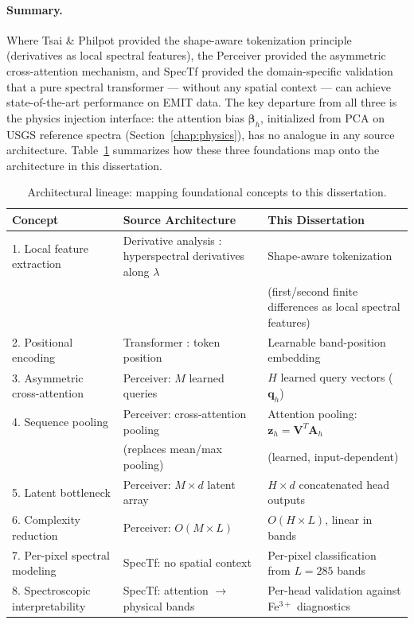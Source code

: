 \documentclass[11pt]{report}
\begin{document}
\paragraph{Summary.}
Where Tsai \& Philpot provided the shape-aware tokenization principle (derivatives as local spectral features), the Perceiver provided the asymmetric cross-attention mechanism, and SpecTf provided the domain-specific validation that a pure spectral transformer --- without any spatial context --- can achieve state-of-the-art performance on EMIT data. The key departure from all three is the physics injection interface: the attention bias $\bm{\beta}_h$, initialized from PCA on USGS reference spectra (Section~\ref{chap:physics}), has no analogue in any source architecture. Table~\ref{tab:arch_inspirations} summarizes how these three foundations map onto the architecture in this dissertation.

\begin{table}[htbp]
\centering
\caption{Architectural lineage: mapping foundational concepts to this dissertation.}
\label{tab:arch_inspirations}
\begin{tabular}{p{}p{}p{}}
\hline
\textbf{Concept} & \textbf{Source Architecture} & \textbf{This Dissertation} \\
\hline
1. Local feature extraction & Derivative analysis \cite{tsai1998derivative}: hyperspectral derivatives along $\lambda$ & Shape-aware tokenization \\
 & & (first/second finite differences as local spectral features) \\
\hline
2. Positional encoding & Transformer \cite{vaswani2017attention}: token position & Learnable band-position embedding \\
\hline
3. Asymmetric cross-attention & Perceiver: $M$ learned queries & $H$ learned query vectors ($\mathbf{q}_h$) \\
\hline
4. Sequence pooling & Perceiver: cross-attention pooling & Attention pooling: $\mathbf{z}_h = \mathbf{V}^T\mathbf{A}_h$ \\
 & (replaces mean/max pooling) & (learned, input-dependent) \\
\hline
5. Latent bottleneck & Perceiver: $M \times d$ latent array & $H \times d$ concatenated head outputs \\
\hline
6. Complexity reduction & Perceiver: $O(M \times L)$ & $O(H \times L)$, linear in bands \\
\hline
7. Per-pixel spectral modeling & SpecTf: no spatial context & Per-pixel classification from $L = 285$ bands \\
\hline
8. Spectroscopic interpretability & SpecTf: attention $\to$ physical bands & Per-head validation against Fe$^{3+}$ diagnostics \\
\hline
\end{tabular}
\end{table}
\end{document}
